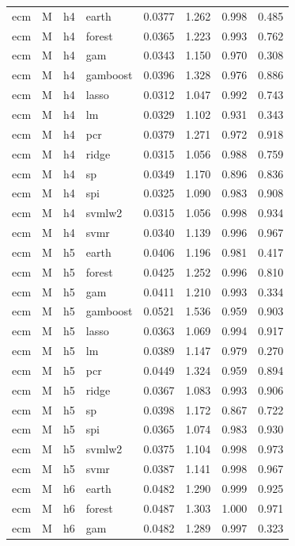 \begin{ThreePartTable}
\begin{longtable}[t]{llclcccc}
\addlinespace
ecm & M & h4 & earth & 0.0377 & 1.262 & 0.998 & 0.485\\
ecm & M & h4 & forest & 0.0365 & 1.223 & 0.993 & 0.762\\
ecm & M & h4 & gam & 0.0343 & 1.150 & 0.970 & 0.308\\
ecm & M & h4 & gamboost & 0.0396 & 1.328 & 0.976 & 0.886\\
ecm & M & h4 & lasso & 0.0312 & 1.047 & 0.992 & 0.743\\
ecm & M & h4 & lm & 0.0329 & 1.102 & 0.931 & 0.343\\
ecm & M & h4 & pcr & 0.0379 & 1.271 & 0.972 & 0.918\\
ecm & M & h4 & ridge & 0.0315 & 1.056 & 0.988 & 0.759\\
ecm & M & h4 & sp & 0.0349 & 1.170 & 0.896 & 0.836\\
ecm & M & h4 & spi & 0.0325 & 1.090 & 0.983 & 0.908\\
ecm & M & h4 & svmlw2 & 0.0315 & 1.056 & 0.998 & 0.934\\
ecm & M & h4 & svmr & 0.0340 & 1.139 & 0.996 & 0.967\\
\addlinespace
ecm & M & h5 & earth & 0.0406 & 1.196 & 0.981 & 0.417\\
ecm & M & h5 & forest & 0.0425 & 1.252 & 0.996 & 0.810\\
ecm & M & h5 & gam & 0.0411 & 1.210 & 0.993 & 0.334\\
ecm & M & h5 & gamboost & 0.0521 & 1.536 & 0.959 & 0.903\\
ecm & M & h5 & lasso & 0.0363 & 1.069 & 0.994 & 0.917\\
ecm & M & h5 & lm & 0.0389 & 1.147 & 0.979 & 0.270\\
ecm & M & h5 & pcr & 0.0449 & 1.324 & 0.959 & 0.894\\
ecm & M & h5 & ridge & 0.0367 & 1.083 & 0.993 & 0.906\\
ecm & M & h5 & sp & 0.0398 & 1.172 & 0.867 & 0.722\\
ecm & M & h5 & spi & 0.0365 & 1.074 & 0.983 & 0.930\\
ecm & M & h5 & svmlw2 & 0.0375 & 1.104 & 0.998 & 0.973\\
ecm & M & h5 & svmr & 0.0387 & 1.141 & 0.998 & 0.967\\
\addlinespace
ecm & M & h6 & earth & 0.0482 & 1.290 & 0.999 & 0.925\\
ecm & M & h6 & forest & 0.0487 & 1.303 & 1.000 & 0.971\\
ecm & M & h6 & gam & 0.0482 & 1.289 & 0.997 & 0.323\\

\end{longtable}
\end{ThreePartTable}

